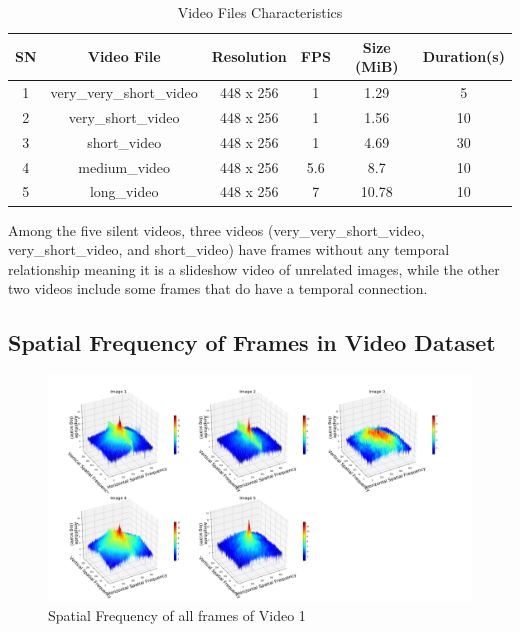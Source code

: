 \documentclass{ioereport}
\begin{document}
\begin{table}[H]
\centering
\caption{Video Files Characteristics}
\label{tab:video_files}
\begin{tabular}{|c|c|c|c|c|c|}
    \hline
    \textbf{SN} & \textbf{Video File} & \textbf{Resolution} & \textbf{FPS} & \textbf{Size (MiB)} & \textbf{Duration(s)}\\ 
    \hline 
    1 & very\_very\_short\_video & 448 x 256 & 1 & 1.29 & 5\\ 
    \hline 
    2 & very\_short\_video &448 x 256 & 1 & 1.56 & 10\\ 
    \hline 
    3 & short\_video & 448 x 256 & 1 & 4.69 & 30 \\ 
    \hline 
    4 & medium\_video & 448 x 256 & 5.6 & 8.7 & 10\\ 
    \hline 
    5 & long\_video & 448 x 256 & 7 & 10.78 & 10\\ 
    \hline
\end{tabular}
\end{table}

Among the five silent videos, three videos (very\_very\_short\_video, very\_short\_video, and short\_video) have frames without any temporal relationship meaning it is a slideshow video of unrelated images, while the other two videos include some frames that do have a temporal connection.


\subsection{Spatial Frequency of Frames in Video Dataset}
\begin{figure}[H]
    \centering
    \includegraphics[width=\linewidth]{assets/spatial_frequency/video1spatialfreq.png}
    \caption{Spatial Frequency of all frames of Video 1}
    \label{fig:spatial-frequency-1}
\end{figure}
\end{document}
